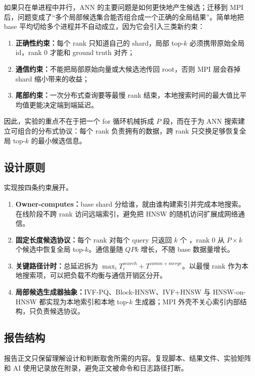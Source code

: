 \documentclass[a4paper,11pt,UTF8]{ctexart}
\newcommand{\code}[1]{\texttt{\detokenize{#1}}}
\begin{document}
如果只在单进程中并行，ANN 的主要问题是如何更快地产生候选；迁移到 MPI 后，问题变成了“多个局部候选集合能否组合成一个正确的全局结果”。简单地把 base 平均切给多个进程并不自动成立，因为它会引入三类新约束：
\begin{enumerate}
  \item \textbf{正确性约束：}每个 rank 只知道自己的 shard，局部 top-$k$ 必须携带原始全局 id，rank 0 才能和 ground truth 对齐；
  \item \textbf{通信约束：}不能把局部原始向量或大候选池传回 root，否则 MPI 层会吞掉 shard 缩小带来的收益；
  \item \textbf{尾部约束：}一次分布式查询要等最慢 rank 结束，本地搜索时间的最大值比平均值更能决定端到端延迟。
\end{enumerate}

因此，实验的重点不在于把一个 for 循环机械拆成 $P$ 段，而在于为 ANN 搜索建立可组合的分布式协议：每个 rank 负责拥有的数据，跨 rank 只交换足够恢复全局 top-$k$ 的最小候选信息。

\subsection{设计原则}

实现按四条约束展开。

\begin{enumerate}
  \item \textbf{Owner-computes：}base shard 分给谁，就由谁构建索引并完成本地搜索。在线阶段不跨 rank 访问远端索引，避免把 HNSW 的随机访问扩展成网络通信。
  \item \textbf{固定长度候选协议：}每个 rank 对每个 query 只返回 $k$ 个 \code{(distance, global_id)}，rank 0 从 $P\times k$ 个候选中恢复全局 top-$k$。通信量随 $QPk$ 增长，不随 base 数据量增长。
  \item \textbf{关键路径计时：}总延迟拆为 $\max_i T_i^{search}+T^{comm+merge}$。以最慢 rank 作为本地搜索项，可以把负载不均衡与通信开销区分开。
  \item \textbf{局部候选生成器抽象：}IVF-PQ、Block-HNSW、IVF+HNSW 与 HNSW-on-HNSW 都实现为本地索引和本地 top-$k$ 生成器；MPI 外壳不关心索引内部结构，只负责候选协议。
\end{enumerate}

\subsection{报告结构}

报告正文只保留理解设计和判断取舍所需的内容。复现脚本、结果文件、实验矩阵和 AI 使用记录放在附录，避免正文被命令和日志路径打断。
\end{document}
